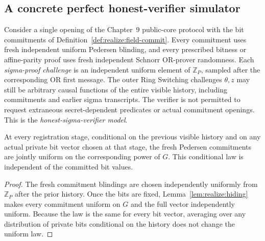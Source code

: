 \subsection{A concrete perfect honest-verifier simulator}\label{sec:realize:hvzk}

\begin{definition}\label{def:realize:hv-model}
Consider a single opening of the Chapter~9 public-core
protocol with the bit commitments of
Definition~\ref{def:realize:field-commit}.
Every commitment uses fresh independent uniform
Pedersen blinding, and every prescribed bitness
or affine-parity proof uses fresh independent
Schnorr OR-prover randomness.
Each \emph{sigma-proof challenge} is an
independent uniform element of $\mathbb Z_P$,
sampled after the corresponding OR first message.
The outer Ring Switching challenges $\theta,z$
may still be arbitrary causal functions of the
entire visible history, including commitments and
earlier sigma transcripts.
The verifier is not permitted to request
extraneous secret-dependent predicates or
actual commitment openings.
This is the \emph{honest-sigma-verifier model}.
\end{definition}

\begin{lemma}\label{lem:realize:conditional-commit}
At every registration stage, conditional on the
previous visible history and on any actual
private bit vector chosen at that stage,
the fresh Pedersen commitments are jointly
uniform on the corresponding power of $G$.
This conditional law is independent of the
committed bit values.
\end{lemma}
\begin{proof}
The fresh commitment blindings are chosen
independently uniformly from $\mathbb Z_P$
after the prior history. Once the bits
are fixed, Lemma~\ref{lem:realize:hiding}
makes every commitment uniform on $G$
and the full vector independently uniform.
Because the law is the same for every bit
vector, averaging over any distribution
of private bits conditional on the history
does not change the uniform law.
\end{proof}

